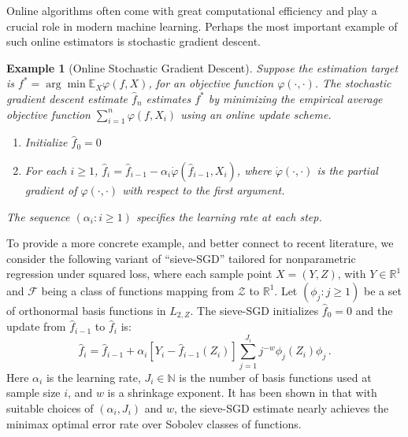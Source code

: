 \documentclass[11pt]{article}
\theoremstyle{plain}
\newtheorem{example}[theorem]{Example}
\begin{document}
Online algorithms often come with great computational efficiency and play a crucial role in modern machine learning.
Perhaps the most important example of such online estimators is stochastic gradient descent.
\begin{example}[Online Stochastic Gradient Descent]\label{exa:3.2-sgd}
    Suppose the estimation target is $f^*=\arg\min \mathbb E_X\varphi(f,X)$, for an objective function $\varphi(\cdot,\cdot)$. The stochastic gradient descent estimate $\hat f_n$ estimates $f^*$ by minimizing the empirical average objective function $\sum_{i=1}^n \varphi(f,X_i)$ using an online update scheme.
    \begin{enumerate}
        \item [(i)] Initialize $\hat f_0=0$
        \item [(ii)] For each $i\ge 1$, $\hat f_i = \hat f_{i-1}-\alpha_i\dot\varphi(\hat f_{i-1},X_i)$, where $\dot\varphi(\cdot,\cdot)$ is the partial gradient of $\varphi(\cdot,\cdot)$ with respect to the first argument.
    \end{enumerate}
    The sequence $(\alpha_i:i\ge 1)$ specifies the learning rate at each step.
\end{example}

To provide a more concrete example, and better connect to recent literature, we consider the following variant of ``sieve-SGD'' tailored for nonparametric regression under squared loss, where each sample point $X=(Y,Z)$, with $Y\in\mathbb R^1$ and $\mathcal F$ being a class of functions mapping from $\mathcal Z$ to $\mathbb R^1$. Let $(\phi_j:j\ge 1)$ be a set of orthonormal basis functions in $L_{2,Z}$. The sieve-SGD initializes $\hat f_0=0$ and the update from $\hat f_{i-1}$ to $\hat f_{i}$ is:
\begin{equation}\label{eq:3.2-sieve-sgd}
    \hat f_{i} = \hat f_{i-1}+\alpha_{i}\left[Y_i - \hat f_{i-1}(Z_i)\right]\sum_{j=1}^{J_i}j^{-w}\phi_j(Z_i)\phi_j\,.
\end{equation}
Here $\alpha_i$ is the learning rate, $J_i\in \mathbb N$ is the number of basis functions used at sample size $i$, and $w$ is a shrinkage exponent.  It has been shown in \cite{zhang2022sieve} that with suitable choices of $(\alpha_i,J_i)$ and $w$, the sieve-SGD estimate nearly achieves the minimax optimal error rate over Sobolev classes of functions.
\end{document}
